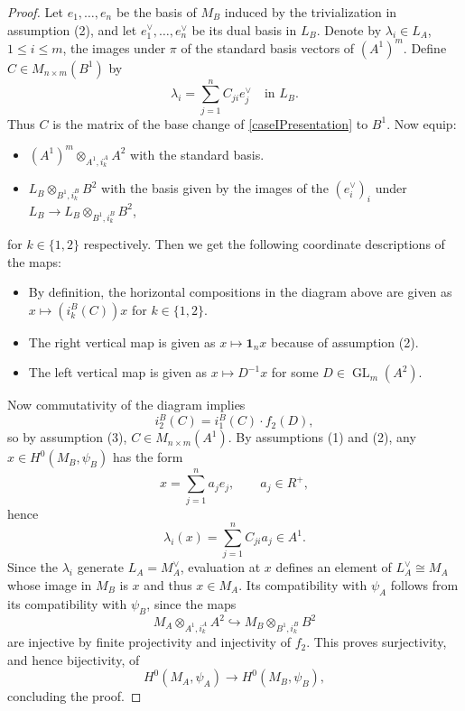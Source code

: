 \documentclass[10pt,twoside]{article}
\numberwithin{equation}{section}
\theoremstyle{plain}
\theoremstyle{definition}
\DeclareMathOperator{\GL}{GL}
\begin{document}
\begin{proof}
Let \(e_1,\dots,e_n\) be the basis of \(M_B\) induced by the trivialization in assumption (2), and let \(e_1^\vee,\dots,e_n^\vee\) be its dual basis in \(L_B\). Denote by \(\lambda_i\in L_A\), \(1\leq i\leq m\), the images under \(\pi\) of the standard basis vectors of \((A^1)^m\). Define \(C\in M_{n\times m}(B^1)\) by
\[\lambda_i=\sum_{j=1}^n C_{ji}e_j^\vee\quad\text{in }L_B.\]
Thus \(C\) is the matrix of the base change of \eqref{caseIPresentation} to \(B^1\). Now equip:
\begin{itemize}
    \item \((A^1)^m\otimes_{A^1,i_k^A} A^2\) with the standard basis.
    \item \(L_B\otimes_{B^1,i^B_k} B^2\) with the basis given by the images of the \((e_i^\vee)_i\) under \(L_B\to L_B\otimes_{B^1,i_k^B}B^2\),
\end{itemize}
for \(k\in \{1,2\}\) respectively. Then we get the following coordinate descriptions of the maps:
\begin{itemize}
    \item By definition, the horizontal compositions in the diagram above are given as \(x\mapsto (i_k^B(C))x\) for \(k\in \{1,2\}\).
    \item The right vertical map is given as \(x\mapsto \mathbf{1}_nx\) because of assumption (2).
    \item The left vertical map is given as \(x\mapsto D^{-1}x\) for some \(D\in \GL_m(A^2)\).
\end{itemize}

Now commutativity of the diagram implies
\[i_2^B(C)=i^B_1(C)\cdot f_2(D),\]
so by assumption (3), \(C\in M_{n\times m}(A^1)\). By assumptions (1) and (2), any \(x\in H^0(M_B,\psi_B)\) has the form
\[x=\sum_{j=1}^n a_je_j,\qquad a_j\in R^+,\]
hence
\[\lambda_i(x)=\sum_{j=1}^n C_{ji}a_j\in A^1.\]
Since the \(\lambda_i\) generate \(L_A=M_A^\vee\), evaluation at \(x\) defines an element of \(L_A^\vee\cong M_A\) whose image in \(M_B\) is \(x\) and thus \(x\in M_A\). Its compatibility with \(\psi_A\) follows from its compatibility with \(\psi_B\), since the maps
\[M_A\otimes_{A^1,i_k^A}A^2\hookrightarrow M_B\otimes_{B^1,i_k^B}B^2\]
are injective by finite projectivity and injectivity of \(f_2\). This proves surjectivity, and hence bijectivity, of
\[H^0(M_A,\psi_A)\longrightarrow H^0(M_B,\psi_B),\]
concluding the proof.
\end{proof}
\end{document}
